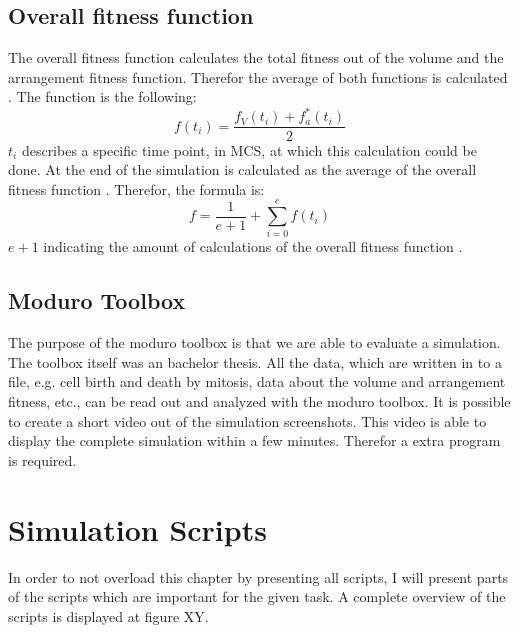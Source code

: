 \subsection{Overall fitness function}
The overall fitness function calculates the total fitness out of the volume and the arrangement fitness function. Therefor the average of both functions is calculated \cite{Torelli2017}. The function is the following:
\begin{equation} 
f(t_{i}) = \dfrac{f_{V}(t_{i})+f_{a}^{*}(t_{i})}{2}
\end{equation}
$t_{i}$ describes a specific time point, in \ac{MCS}, at which this calculation could be done. At the end of the simulation is calculated as the average of the overall fitness function \cite{Torelli2017}. Therefor, the formula is:
\begin{equation} 
f = \dfrac{1}{e+1} + \sum_{i=0}^{e}{f(t_{i})}
\end{equation}
$e+1$ indicating the amount of calculations of the overall fitness function \cite{Torelli2017}.



\subsection{Moduro Toolbox}
The purpose of the moduro toolbox is that we are able to evaluate a simulation. The toolbox itself was an bachelor thesis. All the data, which are written in to a file, e.g. cell birth and death by mitosis, data about the volume and arrangement fitness, etc., can be read out and analyzed with the moduro toolbox.
It is possible to create a short video out of the simulation screenshots. This video is able to display the complete simulation within a few minutes. Therefor a extra program is required.




\section{Simulation Scripts}
In order to not overload this chapter by presenting all scripts, I will present parts of the scripts which are important for the given task. A complete overview of the scripts is displayed at figure XY.

